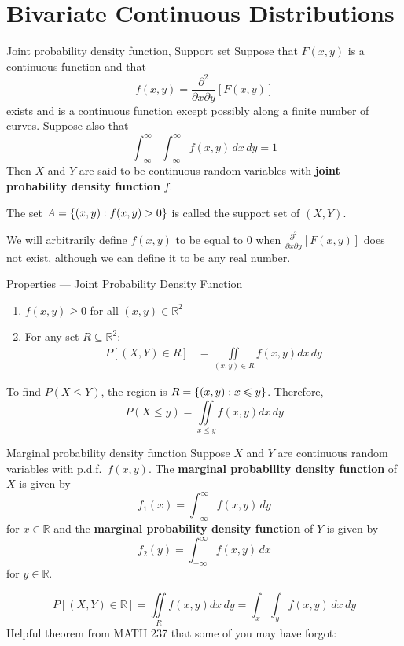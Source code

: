 \section{Bivariate Continuous Distributions}
\begin{Definition}{Joint probability density function, Support set}{}
    Suppose that $ F(x,y) $ is a continuous
    function and that
    \[ f(x,y)=\frac{\partial^2}{\partial x\partial y}\left[ F(x,y) \right]  \]
    exists and is a continuous function
    except possibly along a finite number of curves.
    Suppose also that
    \[ \int_{-\infty}^{\infty} \int_{-\infty}^{\infty} f(x,y)\, d{x}\, d{y}=1  \]
    Then $ X $ and $ Y $ are said to be continuous random
    variables with \textbf{joint probability density function} $ f $.

    The set $ A=\{(x,y):f(x,y)>0\} $ is called the support set of $ (X,Y) $.
\end{Definition}
\begin{Remark}{}{}
    We will arbitrarily define $ f(x,y) $ to be equal to $ 0 $ when
    $ \displaystyle  \frac{\partial^2}{\partial x\partial y}\left[ F(x,y) \right]
    $
    does not exist, although we can define it to be any real number.
\end{Remark}
\begin{Definition}{Properties --- Joint Probability Density Function}{}
    \begin{enumerate}[label=(\Roman*)]
        \item $ f(x,y)\geqslant 0 $ for all $ (x,y)\in\mathbb{R}^2 $
        \item For any set $ R\subseteq \mathbb{R}^2 $:
              \begin{align*}
                  P\left[ (X,Y)\in R \right]
                   & =\iint\limits_{(x,y)\in R}f(x,y)dx\,dy
              \end{align*}
    \end{enumerate}
\end{Definition}
\begin{Example}{}{}
    To find $ P(X\leqslant Y) $, the region is
    $ R=\{(x,y):x\leqslant y\} $. Therefore,
    \[ P(X\leqslant y)=
        \iint\limits_{x\leqslant y}f(x,y)dx\,dy \]
\end{Example}
\begin{Definition}{Marginal probability density function}{}
    Suppose $ X $ and $ Y $ are continuous random variables with
    p.d.f.\ $ f(x,y) $. The \textbf{marginal probability
        density function} of $ X $ is given by
    \[ f_1(x)=\int_{-\infty}^{\infty} f(x,y)\, d{y} \]
    for $ x\in\mathbb{R} $ and the \textbf{marginal probability
        density function} of $ Y $ is given by
    \[ f_2(y)=\int_{-\infty}^{\infty} f(x,y)\, d{x}  \]
    for $ y\in\mathbb{R} $.
\end{Definition}
\[ P\left[ (X,Y)\in\mathbb{R} \right]
    =\iint\limits_{R}f(x,y)dx\,dy=
    \int_{x} \int_{y}f(x,y) \, d{x} \, d{y} \]
Helpful theorem from MATH 237 that some of you may have forgot:

